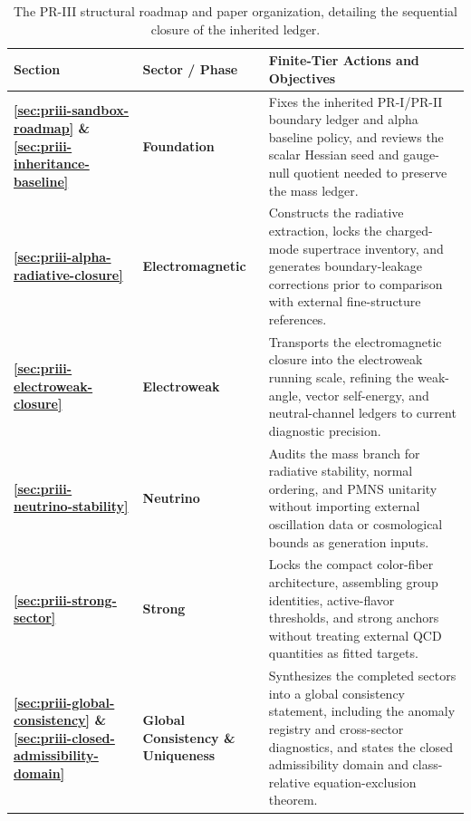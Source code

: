 \documentclass[11pt]{article}
\renewcommand{\arraystretch}{1.22}
\renewcommand{\arraystretch}{1.4}
\begin{document}
\begin{table}[h]
\centering
\renewcommand{\arraystretch}{1.5}
\begin{tabular}{@{} >{\bfseries}p{2.5cm} >{\bfseries}p{4.5cm} p{9.3cm} @{}}
\toprule
Section & Sector / Phase & Finite-Tier Actions and Objectives \\
\midrule
\ref{sec:priii-sandbox-roadmap} \& \ref{sec:priii-inheritance-baseline} & Foundation & Fixes the inherited PR-I/PR-II boundary ledger and alpha baseline policy, and reviews the scalar Hessian seed and gauge-null quotient needed to preserve the mass ledger. \\

\ref{sec:priii-alpha-radiative-closure} & Electromagnetic & Constructs the radiative extraction, locks the charged-mode supertrace inventory, and generates boundary-leakage corrections prior to comparison with external fine-structure references. \\

\ref{sec:priii-electroweak-closure} & Electroweak & Transports the electromagnetic closure into the electroweak running scale, refining the weak-angle, vector self-energy, and neutral-channel ledgers to current diagnostic precision. \\

\ref{sec:priii-neutrino-stability} & Neutrino & Audits the mass branch for radiative stability, normal ordering, and PMNS unitarity without importing external oscillation data or cosmological bounds as generation inputs. \\

\ref{sec:priii-strong-sector} & Strong & Locks the compact color-fiber architecture, assembling group identities, active-flavor thresholds, and strong anchors without treating external QCD quantities as fitted targets. \\

\ref{sec:priii-global-consistency} \& \ref{sec:priii-closed-admissibility-domain} & Global Consistency \& Uniqueness & Synthesizes the completed sectors into a global consistency statement, including the anomaly registry and cross-sector diagnostics, and states the closed admissibility domain and class-relative equation-exclusion theorem. \\
\bottomrule
\end{tabular}
\caption{The PR-III structural roadmap and paper organization, detailing the sequential closure of the inherited ledger.}
\label{tab:structural-roadmap}
\end{table} 
\end{document}
